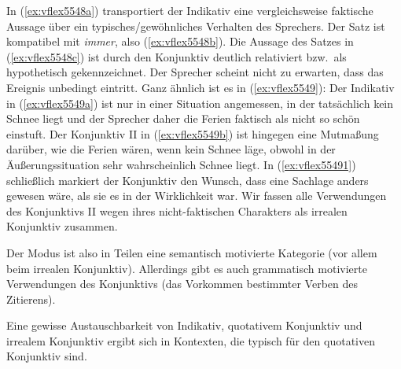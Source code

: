 In (\ref{ex:vflex5548a}) transportiert der Indikativ eine vergleichsweise faktische Aussage über ein typisches\slash gewöhnliches Verhalten des Sprechers.
Der Satz ist kompatibel mit \textit{immer}, also (\ref{ex:vflex5548b}).
Die Aussage des Satzes in (\ref{ex:vflex5548c}) ist durch den Konjunktiv deutlich relativiert bzw.\ als hypothetisch gekennzeichnet.
Der Sprecher scheint nicht zu erwarten, dass das Ereignis unbedingt eintritt.
Ganz ähnlich ist es in (\ref{ex:vflex5549}):
Der Indikativ in (\ref{ex:vflex5549a}) ist nur in einer Situation angemessen, in der tatsächlich kein Schnee liegt und der Sprecher daher die Ferien faktisch als nicht so schön einstuft.
Der Konjunktiv II in (\ref{ex:vflex5549b}) ist hingegen eine Mutmaßung darüber, wie die Ferien wären, wenn kein Schnee läge, obwohl in der Äußerungssituation sehr wahrscheinlich Schnee liegt.
In (\ref{ex:vflex55491}) schließlich markiert der Konjunktiv den Wunsch, dass eine Sachlage anders gewesen wäre, als sie es in der Wirklichkeit war.
Wir fassen alle Verwendungen des Konjunktivs II wegen ihres nicht-faktischen Charakters als irrealen Konjunktiv zusammen.

Der Modus ist also in Teilen eine semantisch motivierte Kategorie (vor allem beim irrealen Konjunktiv).
Allerdings gibt es auch grammatisch motivierte Verwendungen des Konjunktivs (das Vorkommen bestimmter Verben des Zitierens).



Eine gewisse Austauschbarkeit von Indikativ, quotativem Konjunktiv und irrealem Konjunktiv ergibt sich in Kontexten, die typisch für den quotativen Konjunktiv sind.

\begin{exe}
  \ex\label{ex:vflex2208}
  \begin{xlist}
  \end{xlist}
\end{exe}

